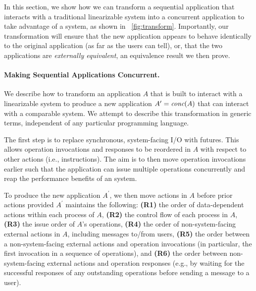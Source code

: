 In this section, we show how we can transform a sequential application that interacts with
a traditional linearizable system into a concurrent application to take advantage of a \mdl{} system, as shown in ~\ref{fig:transform}. Importantly, our transformation will ensure that the new
application appears to behave identically to the original application (as far as
the users can tell), or, that the two applications are \textit{externally equivalent}, an equivalence result we then prove.


\paragraph{Making Sequential Applications Concurrent.}
\label{sec:mdl:transform}

We describe how to transform an application $A$ that is built to
interact with a linearizable system to produce a new application
$A^\prime = \operatorname*{\textit{conc}}(A)$ that can interact with a comparable \MDL{} system.
We attempt to describe this transformation in generic terms, independent of any particular programming language.

The first step is to replace synchronous, system-facing I/O with
futures. This allows operation invocations and responses
to be reordered in $A$ with respect to other actions (i.e., instructions).
The aim is to then move operation invocations earlier such that the application
can issue multiple operations concurrently and reap the performance benefits 
of an \MDL{} system.


To produce the new application $A^\prime$, we then move actions in $A$ before prior 
actions provided $A^\prime$ maintains the following:
\textbf{(R1)} the order of data-dependent actions within
each process of $A$,
\textbf{(R2)} the control flow of each process in $A$,
\textbf{(R3)} the issue order of $A$'s operations,
\textbf{(R4)} the order of non-system-facing external
actions in $A$, including messages to/from users,
\textbf{(R5)} the order between a non-system-facing external 
actions and operation invocations (in particular, the first invocation in a
sequence of operations), and
\textbf{(R6)} the order between non-system-facing external actions and operation responses (e.g., by waiting for the successful responses of any outstanding operations before sending a message to a user).


